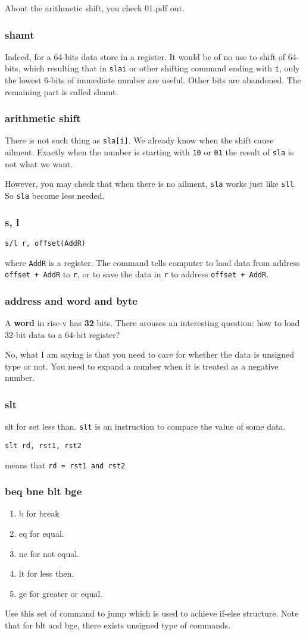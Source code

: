 \documentclass[12pt]{ctexart}
\theoremstyle{definition}
\theoremstyle{definition}
\theoremstyle{plain}
\begin{document}
About the arithmetic shift, you check 01.pdf out.
\subsubsection{shamt}
Indeed, for a 64-bits data store in a register. It would be of no use to shift of 64-bits, which resulting that in \texttt{slai} or other shifting command ending with \texttt{i}, only the lowest 6-bits of immediate number are useful. Other bits are abandoned. The remaining part is called shamt. 
\subsubsection{arithmetic shift}
There is not such thing as \texttt{sla[i]}. We already know when the shift cause ailment. Exactly when the number is starting with \texttt{10} or \texttt{01} the result of \texttt{sla} is not what we want. 

However, you may check that when there is no ailment, \texttt{sla} works just like \texttt{sll}. So \texttt{sla} become less needed. 
\subsubsection{s, l}
\centerline{\texttt{s/l r, offset(AddR)}}
where \texttt{AddR} is a register. The command tells computer to load data from address \texttt{offset + AddR} to \texttt{r}, or to save the data in \texttt{r} to address \texttt{offset + AddR}.
\subsubsection{address and word and byte}
A \textbf{word} in risc-v has \textbf{32} bits. There arouses an interesting question: how to load 32-bit data to a 64-bit register? 

No, what I am saying is that you need to care for whether the data is unsigned type or not. You need to expand a number when it is treated as a negative number. 
\subsubsection{slt}
slt for set less than. \texttt{slt} is an instruction to compare the value of some data. 

\centerline{\texttt{slt rd, rst1, rst2}} 
means that \texttt{rd = rst1 and rst2}
\subsubsection{beq bne blt bge}
\begin{enumerate}
\item b for break
\item eq for equal.
\item ne for not equal. 
\item lt for less then.
\item ge for greater or equal.
\end{enumerate}
Use this set of command to jump which is used to achieve if-else structure. Note that for blt and bge, there exists unsigned type of commands. 
\end{document}
